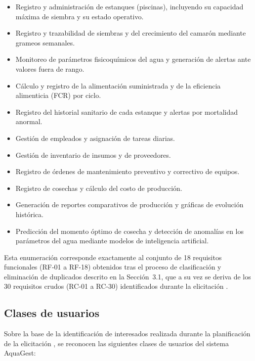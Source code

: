 \documentclass[12pt,a4paper]{article}
\begin{document}
\begin{itemize}[nosep]
  \item Registro y administración de estanques (piscinas), incluyendo su
        capacidad máxima de siembra y su estado operativo.
  \item Registro y trazabilidad de siembras y del crecimiento del camarón
        mediante grameos semanales.
  \item Monitoreo de parámetros fisicoquímicos del agua y generación de
        alertas ante valores fuera de rango.
  \item Cálculo y registro de la alimentación suministrada y de la eficiencia
        alimenticia (FCR) por ciclo.
  \item Registro del historial sanitario de cada estanque y alertas por
        mortalidad anormal.
  \item Gestión de empleados y asignación de tareas diarias.
  \item Gestión de inventario de insumos y de proveedores.
  \item Registro de órdenes de mantenimiento preventivo y correctivo de
        equipos.
  \item Registro de cosechas y cálculo del costo de producción.
  \item Generación de reportes comparativos de producción y gráficas de
        evolución histórica.
  \item Predicción del momento óptimo de cosecha y detección de anomalías en
        los parámetros del agua mediante modelos de inteligencia artificial.
\end{itemize}

Esta enumeración corresponde exactamente al conjunto de 18 requisitos
funcionales (RF-01 a RF-18) obtenidos tras el proceso de clasificación y
eliminación de duplicados descrito en la Sección~3.1, que a su vez se deriva de
los 30 requisitos crudos (RC-01 a RC-30) identificados durante la elicitación
\cite{ISO29148:2018,SWEBOK2024}.

\subsection{Clases de usuarios}

Sobre la base de la identificación de interesados realizada durante la
planificación de la elicitación \cite{PMI2021,Robertson2012}, se reconocen las
siguientes clases de usuarios del sistema AquaGest:
\end{document}
